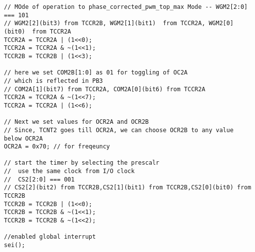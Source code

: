 \documentclass{article}
\begin{document}
\begin{verbatim}
// MOde of operation to phase_corrected_pwm_top_max Mode -- WGM2[2:0] === 101
// WGM2[2](bit3) from TCCR2B, WGM2[1](bit1)  from TCCR2A, WGM2[0](bit0)  from TCCR2A
TCCR2A = TCCR2A | (1<<0);
TCCR2A = TCCR2A & ~(1<<1);
TCCR2B = TCCR2B | (1<<3);	

// here we set COM2B[1:0] as 01 for toggling of OC2A
// which is reflected in PB3
// COM2A[1](bit7) from TCCR2A, COM2A[0](bit6) from TCCR2A
TCCR2A = TCCR2A & ~(1<<7);
TCCR2A = TCCR2A | (1<<6);

// Next we set values for OCR2A and OCR2B
// Since, TCNT2 goes till OCR2A, we can choose OCR2B to any value below OCR2A
OCR2A = 0x70; // for freqeuncy

// start the timer by selecting the prescalr
//  use the same clock from I/O clock
//  CS2[2:0] === 001
// CS2[2](bit2) from TCCR2B,CS2[1](bit1) from TCCR2B,CS2[0](bit0) from TCCR2B
TCCR2B = TCCR2B | (1<<0);
TCCR2B = TCCR2B & ~(1<<1);
TCCR2B = TCCR2B & ~(1<<2);

//enabled global interrupt
sei();
\end{verbatim}
\end{document}
